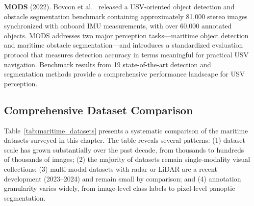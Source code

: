 \textbf{MODS} (2022). Bovcon et al.~\cite{Bovcon2022MODS} released a USV-oriented object
detection and obstacle segmentation benchmark containing approximately 81,000 stereo
images synchronized with onboard IMU measurements, with over 60,000 annotated objects.
MODS addresses two major perception tasks---maritime object detection and maritime
obstacle segmentation---and introduces a standardized evaluation protocol that measures
detection accuracy in terms meaningful for practical USV navigation. Benchmark results
from 19 state-of-the-art detection and segmentation methods provide a comprehensive
performance landscape for USV perception.

\subsection{Comprehensive Dataset Comparison}
\label{subsec:dataset_comparison}

Table~\ref{tab:maritime_datasets} presents a systematic comparison of the maritime
datasets surveyed in this chapter. The table reveals several patterns: (1) dataset scale
has grown substantially over the past decade, from thousands to hundreds of thousands of
images; (2) the majority of datasets remain single-modality visual collections; (3)
multi-modal datasets with radar or LiDAR are a recent development (2023--2024) and remain
small by comparison; and (4) annotation granularity varies widely, from image-level class
labels to pixel-level panoptic segmentation.


